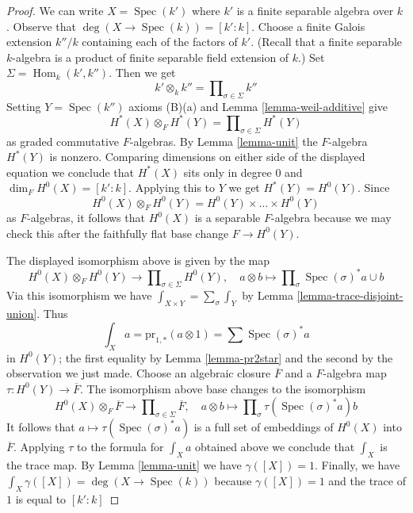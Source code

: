 \documentclass[10pt,a4paper]{amsart}
\theoremstyle{plain}
\theoremstyle{definition}
\theoremstyle{remark}
\numberwithin{equation}{subsection}
\def\Spec{\mathop{\mathrm{Spec}}}
\def\Hom{\mathop{\mathrm{Hom}}\nolimits}
\begin{document}
\begin{proof}
We can write $X = \Spec(k')$ where $k'$ is a finite separable
algebra over $k$. Observe that $\deg(X \to \Spec(k)) = [k' : k]$.
Choose a finite Galois extension $k''/k$ containing each of the
factors of $k'$. (Recall that a finite separable $k$-algebra is
a product of finite separable field extension of $k$.)
Set $\Sigma = \Hom_k(k', k'')$. Then we get
$$
k' \otimes_k k'' = \prod\nolimits_{\sigma \in \Sigma} k''
$$
Setting $Y = \Spec(k'')$ axioms (B)(a) and Lemma \ref{lemma-weil-additive} give
$$
H^*(X) \otimes_F H^*(Y) =
\prod\nolimits_{\sigma \in \Sigma} H^*(Y)
$$
as graded commutative $F$-algebras. By Lemma \ref{lemma-unit} the
$F$-algebra $H^*(Y)$ is nonzero. Comparing dimensions on either side
of the displayed equation we conclude that $H^*(X)$ sits only in degree $0$
and $\dim_F H^0(X) = [k' : k]$. Applying this to $Y$ we get
$H^*(Y) = H^0(Y)$. Since
$$
H^0(X) \otimes_F H^0(Y) = H^0(Y) \times \ldots \times H^0(Y)
$$
as $F$-algebras, it follows that $H^0(X)$ is a separable $F$-algebra
because we may check this after the faithfully flat base change
$F \to H^0(Y)$.

\medskip\noindent
The displayed isomorphism above is given by the map
$$
H^0(X) \otimes_F H^0(Y) \longrightarrow
\prod\nolimits_{\sigma \in \Sigma} H^0(Y),\quad
a \otimes b \longmapsto \prod\nolimits_\sigma \Spec(\sigma)^*a \cup b
$$
Via this isomorphism we have $\int_{X \times Y} = \sum_\sigma \int_Y$ by
Lemma \ref{lemma-trace-disjoint-union}. Thus
$$
\int_X a = \text{pr}_{1, *}(a \otimes 1) = \sum \Spec(\sigma)^*a
$$
in $H^0(Y)$; the first equality by Lemma \ref{lemma-pr2star}
and the second by the observation we just made. Choose an
algebraic closure $\overline{F}$ and
a $F$-algebra map $\tau : H^0(Y) \to \overline{F}$.
The isomorphism above base changes to the isomorphism
$$
H^0(X) \otimes_F \overline{F} \longrightarrow
\prod\nolimits_{\sigma \in \Sigma} \overline{F},\quad
a \otimes b \longmapsto \prod\nolimits_\sigma \tau(\Spec(\sigma)^*a) b
$$
It follows that $a \mapsto \tau(\Spec(\sigma)^*a)$ is a full set
of embeddings of $H^0(X)$ into $\overline{F}$. Applying $\tau$
to the formula for $\int_X a$ obtained above we conclude
that $\int_X$ is the trace map.
By Lemma \ref{lemma-unit} we have $\gamma([X]) = 1$.
Finally, we have $\int_X \gamma([X]) = \deg(X \to \Spec(k))$
because $\gamma([X]) = 1$ and the trace of $1$ is equal to $[k' : k]$
\end{proof}
\end{document}
